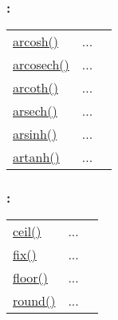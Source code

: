 \subsubsection*{: }

\textcolor{blue}{}\begin{tabular}{>{\raggedleft}p{3cm}>{\centering}p{0.5cm}l}
\textcolor{blue}{\hyperlink{arcosh}{arcosh()}}&
...&
 \begin{NoHyper} \nameref{par:Hyperbolic-area-cosine} \end{NoHyper}\tabularnewline
\textcolor{blue}{\hyperlink{arcosech}{arcosech()}}&
...&
 \begin{NoHyper} \nameref{par:Hyperbolic-area-cosec} \end{NoHyper}\tabularnewline 
\textcolor{blue}{\hyperlink{arcoth}{arcoth()}}&
...&
 \begin{NoHyper} \nameref{par:Hyperbolic-area-cotangent} \end{NoHyper}\tabularnewline
\textcolor{blue}{\hyperlink{arsech}{arsech()}}&
...&
 \begin{NoHyper} \nameref{par:Hyperbolic-area-sec} \end{NoHyper}\tabularnewline
\textcolor{blue}{\hyperlink{arsinh}{arsinh()}}&
...&
 \begin{NoHyper} \nameref{par:Hyperbolic-area-sine} \end{NoHyper}\tabularnewline
\textcolor{blue}{\hyperlink{artanh}{artanh()}}&
...&
 \begin{NoHyper} \nameref{par:Hyperbolic-area-tangent} \end{NoHyper}\tabularnewline
\end{tabular}


\subsubsection*{: }

\textcolor{blue}{}\begin{tabular}{>{\raggedleft}p{3cm}>{\centering}p{0.5cm}l}
\textcolor{blue}{\hyperlink{ceil}{ceil()}}&
...&
 \begin{NoHyper} \nameref{par:ceil} \end{NoHyper}\tabularnewline
\textcolor{blue}{\hyperlink{fix}{fix()}}&
...&
 \begin{NoHyper} \nameref{par:fix} \end{NoHyper}\tabularnewline
\textcolor{blue}{\hyperlink{floor}{floor()}}&
...&
 \begin{NoHyper} \nameref{par:floor} \end{NoHyper}\tabularnewline
\textcolor{blue}{\hyperlink{round}{round()}}&
...&
 \begin{NoHyper} \nameref{par:round} \end{NoHyper}\tabularnewline
\end{tabular}


